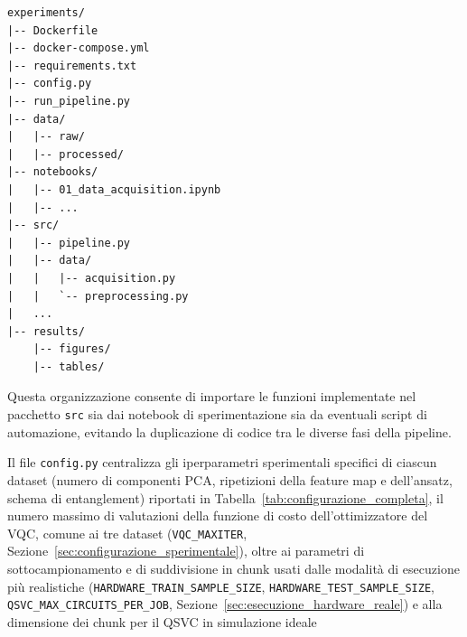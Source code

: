 \begin{verbatim}
experiments/
|-- Dockerfile
|-- docker-compose.yml
|-- requirements.txt
|-- config.py
|-- run_pipeline.py
|-- data/
|   |-- raw/
|   |-- processed/
|-- notebooks/
|   |-- 01_data_acquisition.ipynb
|   |-- ...
|-- src/
|   |-- pipeline.py
|   |-- data/
|   |   |-- acquisition.py
|   |   `-- preprocessing.py
|   ...
|-- results/
    |-- figures/
    |-- tables/
\end{verbatim}

Questa organizzazione consente di importare le funzioni implementate nel pacchetto \texttt{src} sia dai notebook di sperimentazione sia da eventuali script di automazione, evitando la duplicazione di codice tra le diverse fasi della pipeline.

\begin{sloppypar}
Il file \texttt{config.py} centralizza gli iperparametri sperimentali specifici di ciascun dataset (numero di componenti PCA, ripetizioni della feature map e dell'ansatz, schema di entanglement) riportati in Tabella~\ref{tab:configurazione_completa}, il numero massimo di valutazioni della funzione di costo dell'ottimizzatore del VQC, comune ai tre dataset (\texttt{VQC\_MAXITER}, Sezione~\ref{sec:configurazione_sperimentale}), oltre ai parametri di sottocampionamento e di suddivisione in chunk usati dalle modalità di esecuzione più realistiche (\texttt{HARDWARE\_TRAIN\_SAMPLE\_SIZE}, 
\texttt{HARDWARE\_TEST\_SAMPLE\_SIZE}, \texttt{QSVC\_MAX\_CIRCUITS\_PER\_JOB}, Sezione~\ref{sec:esecuzione_hardware_reale}) e alla dimensione dei chunk per il QSVC in simulazione ideale 

\end{sloppypar}
